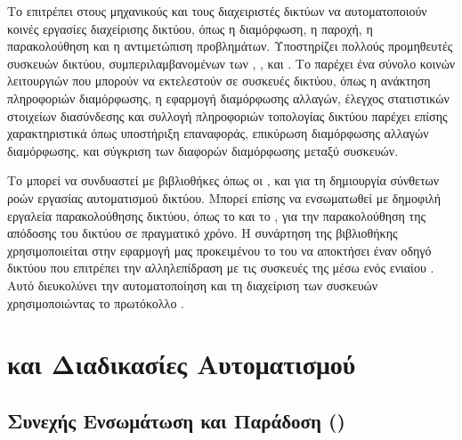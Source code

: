 Το  επιτρέπει στους μηχανικούς και τους διαχειριστές δικτύων να αυτοματοποιούν κοινές εργασίες διαχείρισης δικτύου, όπως η διαμόρφωση, η παροχή, η παρακολούθηση και η 
αντιμετώπιση προβλημάτων. Υποστηρίζει πολλούς προμηθευτές συσκευών δικτύου, συμπεριλαμβανομένων των , ,  και .
Το  παρέχει ένα σύνολο κοινών λειτουργιών που μπορούν να εκτελεστούν σε συσκευές δικτύου, όπως η ανάκτηση πληροφοριών διαμόρφωσης, η εφαρμογή διαμόρφωσης 
αλλαγών, έλεγχος στατιστικών στοιχείων διασύνδεσης και συλλογή πληροφοριών τοπολογίας δικτύου παρέχει επίσης χαρακτηριστικά όπως υποστήριξη επαναφοράς, επικύρωση διαμόρφωσης 
αλλαγών διαμόρφωσης, και σύγκριση των διαφορών διαμόρφωσης μεταξύ συσκευών.


Το  μπορεί να συνδυαστεί με βιβλιοθήκες  όπως οι ,  και  για τη δημιουργία σύνθετων ροών εργασίας αυτοματισμού δικτύου. Μπορεί επίσης να ενσωματωθεί με δημοφιλή εργαλεία παρακολούθησης δικτύου, όπως το  και το , για την παρακολούθηση της απόδοσης του δικτύου σε πραγματικό χρόνο. Η συνάρτηση  της βιβλιοθήκης  χρησιμοποιείται στην εφαρμογή μας  προκειμένου το   του   να αποκτήσει έναν οδηγό δικτύου που επιτρέπει την αλληλεπίδραση με τις συσκευές της  μέσω ενός ενιαίου . Αυτό διευκολύνει την αυτοματοποίηση και τη διαχείριση των συσκευών χρησιμοποιώντας το πρωτόκολλο .





\section{ και Διαδικασίες Αυτοματισμού}

\subsection{Συνεχής Ενσωμάτωση και Παράδοση () }

